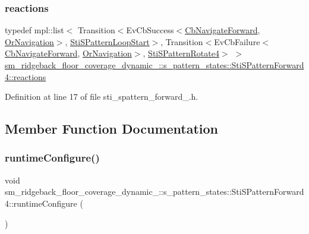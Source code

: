 \subsubsection{\texorpdfstring{reactions}{reactions}}
{\footnotesize\ttfamily typedef mpl\+::list$<$ Transition$<$Ev\+Cb\+Success$<$\hyperlink{classcl__move__base__z_1_1CbNavigateForward}{Cb\+Navigate\+Forward}, \hyperlink{classsm__ridgeback__floor__coverage__dynamic__1_1_1OrNavigation}{Or\+Navigation}$>$, \hyperlink{structsm__ridgeback__floor__coverage__dynamic__1_1_1s__pattern__states_1_1StiSPatternLoopStart}{Sti\+S\+Pattern\+Loop\+Start}$>$, Transition$<$Ev\+Cb\+Failure$<$\hyperlink{classcl__move__base__z_1_1CbNavigateForward}{Cb\+Navigate\+Forward}, \hyperlink{classsm__ridgeback__floor__coverage__dynamic__1_1_1OrNavigation}{Or\+Navigation}$>$, \hyperlink{structsm__ridgeback__floor__coverage__dynamic__1_1_1s__pattern__states_1_1StiSPatternRotate4}{Sti\+S\+Pattern\+Rotate4}$>$ $>$ \hyperlink{structsm__ridgeback__floor__coverage__dynamic__1_1_1s__pattern__states_1_1StiSPatternForward4_a307cac210439983eaa109cd272d4262e}{sm\+\_\+ridgeback\+\_\+floor\+\_\+coverage\+\_\+dynamic\+\_\+::s\+\_\+pattern\+\_\+states\+::\+Sti\+S\+Pattern\+Forward4\+::reactions}}



Definition at line 17 of file sti\+\_\+spattern\+\_\+forward\+\_.\+h.



\subsection{Member Function Documentation}
\mbox{\label{structsm__ridgeback__floor__coverage__dynamic__1_1_1s__pattern__states_1_1StiSPatternForward4_a9f7c98e1be30e98c9235604a0932684e}} 
\subsubsection{\texorpdfstring{runtime\+Configure()}{runtimeConfigure()}}
{\footnotesize\ttfamily void sm\+\_\+ridgeback\+\_\+floor\+\_\+coverage\+\_\+dynamic\+\_\+::s\+\_\+pattern\+\_\+states\+::\+Sti\+S\+Pattern\+Forward4\+::runtime\+Configure (\begin{DoxyParamCaption}{ }\end{DoxyParamCaption})\hspace{0.3cm}{\ttfamily [inline]}}



